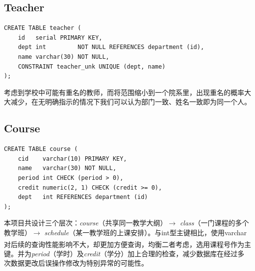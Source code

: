 \subsection{Teacher}
\begin{lstlisting}
CREATE TABLE teacher (
    id   serial PRIMARY KEY,
    dept int         NOT NULL REFERENCES department (id),
    name varchar(30) NOT NULL,
    CONSTRAINT teacher_unk UNIQUE (dept, name)
);

\end{lstlisting}
\vspace{-3em}\par
考虑到学校中可能有重名的教师，而将范围缩小到一个院系里，出现重名的概率大大减少，在无明确指示的情况下我们可以认为部门一致、姓名一致即为同一个人。

\subsection{Course}
\begin{lstlisting}
CREATE TABLE course (
    cid    varchar(10) PRIMARY KEY,
    name   varchar(30) NOT NULL,
    period int CHECK (period > 0),
    credit numeric(2, 1) CHECK (credit >= 0),
    dept   int REFERENCES department (id)
);

\end{lstlisting}
\vspace{-3em}
\par
本项目共设计三个层次：\emph{course}（共享同一教学大纲）$\to$ \emph{class}（一门课程的多个教学班）$\to$ \emph{schedule}（某一教学班的上课安排）。与int型主键相比，使用varchar对后续的查询性能影响不大\textsuperscript{\cite{pk}}，却更加方便查询，均衡二者考虑，选用课程号作为主键。并为\emph{period}（学时）及\emph{credit}（学分）加上合理的检查，减少数据库在经过多次数据更改后误操作修改为特别异常的可能性。

